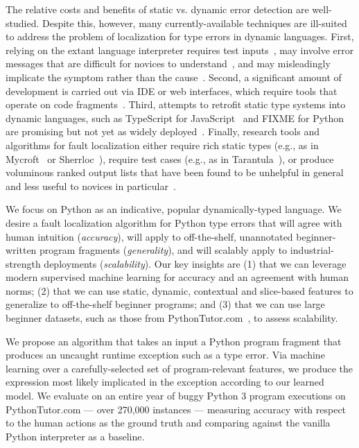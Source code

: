 \documentclass[conference]{IEEEtran}
\begin{document}
The relative costs and benefits of static vs. dynamic error detection are
well-studied. Despite this, however, many currently-available techniques
are ill-suited to address the problem of localization for type errors in
dynamic languages. First, relying on the extant language interpreter
requires test inputs~\cite{FIXME}, may involve error messages that are
difficult for novices to understand~\cite{FIXME}, and may misleadingly
implicate the symptom rather than the cause~\cite{FIXME}.  Second, a
significant amount of development is carried out via IDE or web interfaces,
which require tools that operate on code fragments~\cite{Guo2013-vu}.
Third, attempts to retrofit static type systems into dynamic languages,
such as TypeScript for JavaScript~\cite{FIXME} and FIXME for
Python~\cite{FIXME} are promising but not yet as widely
deployed~\cite{FIXME}. Finally, research tools and algorithms for fault
localization either require rich static types (e.g., as in
Mycroft~\cite{FIXME} or Sherrloc~\cite{FIXME}), require test cases (e.g.,
as in Tarantula~\cite{FIXME}), or produce voluminous ranked output lists
that have been found to be unhelpful in general and less useful to novices
in particular~\cite[Sec.~5.1]{orso-parnin}. 

We focus on Python as an indicative, popular dynamically-typed language.
We desire a fault localization algorithm for Python type errors that
will agree with human intuition (\emph{accuracy}), will apply to
off-the-shelf, unannotated beginner-written program fragments
(\emph{generality}), and will scalably apply to industrial-strength
deployments (\emph{scalability}). Our key insights are (1) that we can leverage
modern supervised machine learning for accuracy and an agreement with human
norms; (2) that we can use static, dynamic, contextual and slice-based
features to generalize to off-the-shelf beginner programs; and (3) that we
can use large beginner datasets, such as those from
PythonTutor.com~\cite{Guo2012-vu}, to assess scalability.

We propose an algorithm that takes an input a Python program fragment that 
produces an uncaught runtime exception such as a type error. Via machine
learning over a carefully-selected set of program-relevant features, we
produce the expression most likely implicated in the exception according to
our learned model. We evaluate on an entire year of buggy Python 3 program
executions on PythonTutor.com --- over 270,000 instances --- measuring
accuracy with respect to the human actions as the ground truth and
comparing against the vanilla Python interpreter as a baseline. 
\end{document}
